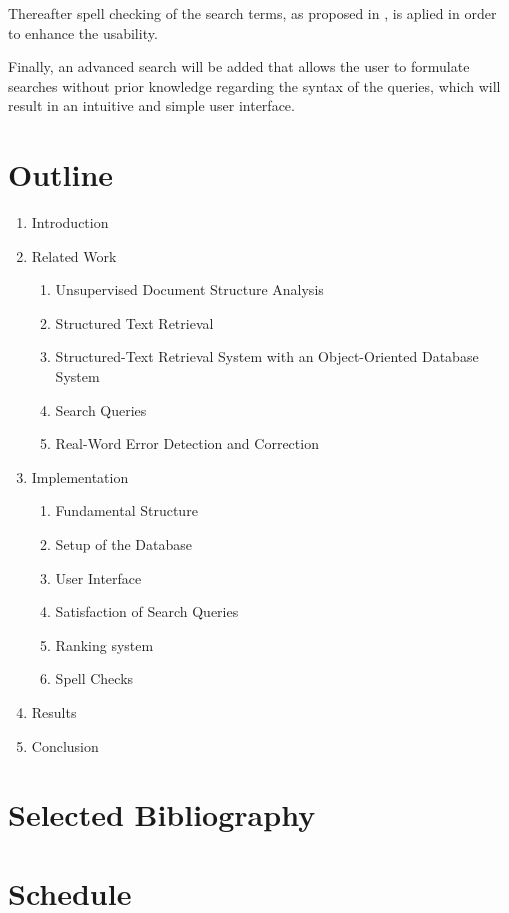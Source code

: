 \documentclass[a4paper, 12pt]{scrartcl}
\begin{document}
Thereafter spell checking of the search terms, as proposed in \cite{SPCB13}, is aplied in order to enhance the usability.

Finally, an advanced search will be added that allows the user to formulate searches without prior knowledge regarding the syntax of the queries, which will result in
an intuitive and simple user interface.

\section{Outline}

\begin{enumerate}
 \item Introduction
 \item Related Work
 \begin{enumerate}
  \item Unsupervised Document Structure Analysis
  \item Structured Text Retrieval
  \item Structured-Text Retrieval System with an Object-Oriented Database System
  \item Search Queries
  \item Real-Word Error Detection and Correction
 \end{enumerate}
 \item Implementation
 \begin{enumerate}
  \item Fundamental Structure
  \item Setup of the Database
  \item User Interface
  \item Satisfaction of Search Queries
  \item Ranking system
  \item Spell Checks
 \end{enumerate}
 \item Results
 \item Conclusion
\end{enumerate}

\section{Selected Bibliography}


\nocite{*}

\section{Schedule}
\end{document}
